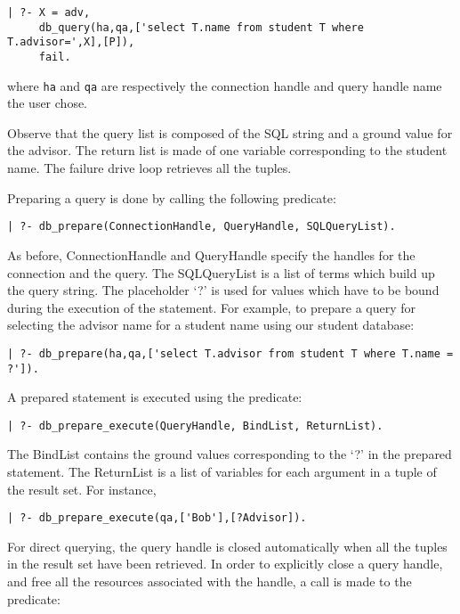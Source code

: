 \begin{verbatim}
| ?- X = adv,
     db_query(ha,qa,['select T.name from student T where T.advisor=',X],[P]),
     fail.
\end{verbatim}

\noindent
where {\tt ha} and {\tt qa} are respectively the connection handle and query
handle name the user chose.

Observe that the query list is composed of the SQL string and a ground value
for the advisor. The return list is made of one variable corresponding to
the student name. The failure drive loop retrieves all the tuples.

Preparing a  query is done by calling the following predicate:

\begin{verbatim}
| ?- db_prepare(ConnectionHandle, QueryHandle, SQLQueryList).
\end{verbatim}

As before, ConnectionHandle and QueryHandle specify the handles for
the connection and the query. The SQLQueryList is a list of terms which
build up the query string. The placeholder `?' is used for values which 
have to be bound during the execution of the statement.
For example, to prepare a query for selecting the advisor name for a student
name using our student database:

\begin{verbatim}
| ?- db_prepare(ha,qa,['select T.advisor from student T where T.name = ?']).
\end{verbatim}

A prepared statement is executed using the predicate:

\begin{verbatim}
| ?- db_prepare_execute(QueryHandle, BindList, ReturnList).
\end{verbatim}

The BindList contains the ground values corresponding to the `?' in
the prepared statement. The ReturnList is a list of variables for
each argument in a tuple of the result set. For instance,
\begin{verbatim}
| ?- db_prepare_execute(qa,['Bob'],[?Advisor]).
\end{verbatim}

For direct querying, the query handle is closed automatically when
all the tuples in the result set have been retrieved. In order to explicitly
close a query handle, and free all the resources associated with
the handle, a call is made to the predicate:

